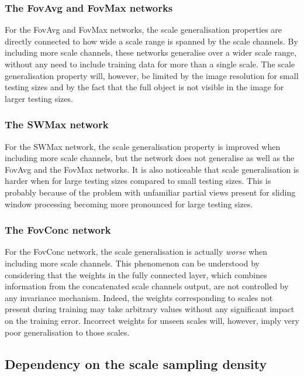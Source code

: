 \documentclass[twocolumn,runningheads]{svjour3}
\begin{document}
\subsubsection{The FovAvg and FovMax networks}

For the FovAvg and FovMax networks, the scale generalisation
properties are directly connected to how wide a scale 
range is spanned by the scale channels. By including more scale
channels, these networks generalise over a wider scale range, without
any need to include training data for more than a single scale.
The scale generalisation property will, however, be limited by the image
resolution for small testing sizes and by the fact that the full object
is not visible in the image for larger testing sizes.

\subsubsection{The SWMax network}

For the SWMax network, the scale generalisation property is improved
when including more scale channels, but the network does not
generalise as well as the FovAvg and the FovMax networks. It is also
noticeable that scale generalisation is harder when for large testing sizes compared to
small testing sizes. This is probably because of the problem with unfamiliar
partial views present for sliding window processing becoming more
pronounced for large testing sizes.

\subsubsection{The FovConc network}

For the FovConc network, the scale generalisation is actually
{\em worse\/} when including more scale channels. This phenomenon can
be understood by considering that the weights in the
fully connected layer, which combines information from the concatenated
scale channels output, are not controlled by any invariance
mechanism.
Indeed, the weights corresponding to scales not present during
training may take arbitrary values without any significant impact on
the training error.
Incorrect weights for unseen scales will, however, imply very poor generalisation to those scales.

\subsection{Dependency on the scale sampling density}
\label{sec-scale-sampl-density}
\end{document}
